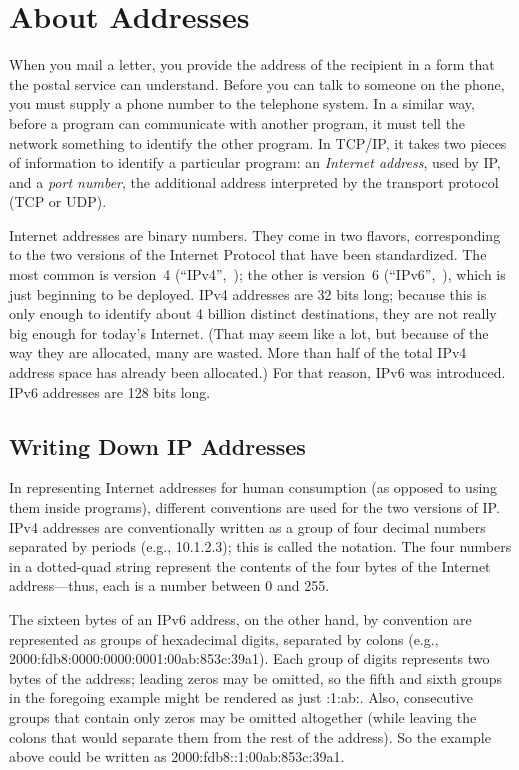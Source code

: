 \section{About Addresses}
\label{sect:introaddr}

When you mail a letter, you provide the address of the recipient in a
form that the postal service can understand. Before you can talk to
someone on the phone, you must supply a phone number to the telephone
system.  In a similar way, before a program can communicate with
another program, it must tell the network something to identify the other
program.  In TCP/IP, it takes two pieces of information to identify a
particular program: an \emph{Internet address}, used by IP, and a
\emph{port number}, the additional address interpreted by the
transport protocol (TCP or UDP).

Internet addresses are binary numbers.  They come in two flavors,
corresponding to the two versions of the Internet Protocol that have
been standardized.  The most common is version~4
(``IPv4'',~\cite{RFC791}); the other is 
version~6 (``IPv6'',~\cite{RFC2460}), which is just beginning to be
deployed.  IPv4 addresses are 32 bits long; because this is only
enough to identify about 4 billion distinct destinations, they are not
really big enough for today's Internet.   (That may seem like a lot,
but because of the way they are allocated, many are wasted.  More than
half of the total IPv4 address space has already been allocated.)
For that reason, IPv6 was introduced.  IPv6 addresses are 128 bits long.

\subsection{Writing Down IP Addresses}

In representing Internet addresses for human consumption (as opposed to
using them inside programs), different conventions are used for the two
versions of IP.  IPv4 addresses are conventionally written as a group of
four decimal numbers separated by periods (e.g., 10.1.2.3); this is
called the  notation.  The four numbers in a
dotted-quad string represent the contents of the four bytes of the
Internet address---thus, each is a number between 0 and 255.

The sixteen bytes of an IPv6 address, on the other hand,
by convention are represented as groups of hexadecimal digits, separated by
colons (e.g., 2000:fdb8:0000:0000:0001:00ab:853c:39a1).  Each group of
digits represents two bytes of the address; leading zeros may be
omitted, so the fifth and sixth groups
in the foregoing example might be rendered as just :1:ab:.
Also, consecutive groups that contain only zeros may be omitted
altogether (while leaving the colons that would separate them from the
rest of the address).  So the example above could be written as
2000:fdb8::1:00ab:853c:39a1.

